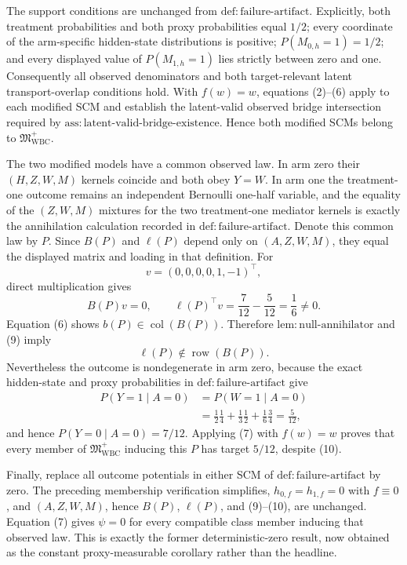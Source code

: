 The support conditions are unchanged from \(\mathrm{def{:}failure\text{-}artifact}\). Explicitly, both treatment probabilities and both proxy probabilities equal \(1/2\); every coordinate of the arm-specific hidden-state distributions is positive; \(P(M_{0,h}=1)=1/2\); and every displayed value of \(P(M_{1,h}=1)\) lies strictly between zero and one. Consequently all observed denominators and both target-relevant latent transport-overlap conditions hold. With \(f(w)=w\), equations (2)--(6) apply to each modified SCM and establish the latent-valid observed bridge intersection required by \(\mathrm{ass{:}latent\text{-}valid\text{-}bridge\text{-}existence}\). Hence both modified SCMs belong to \(\mathfrak M_{\mathrm{WBC}}^{+}\).

The two modified models have a common observed law. In arm zero their \((H,Z,W,M)\) kernels coincide and both obey \(Y=W\). In arm one the treatment-one outcome remains an independent Bernoulli one-half variable, and the equality of the \((Z,W,M)\) mixtures for the two treatment-one mediator kernels is exactly the annihilation calculation recorded in \(\mathrm{def{:}failure\text{-}artifact}\). Denote this common law by \(P\). Since \(B(P)\) and \(\ell(P)\) depend only on \((A,Z,W,M)\), they equal the displayed matrix and loading in that definition. For
\[
v=(0,0,0,0,1,-1)^{\top},
\]
direct multiplication gives
\[
B(P)v=0,
\qquad
\ell(P)^{\top}v=\frac{7}{12}-\frac{5}{12}=\frac16\ne0.
\tag{9}
\]
Equation (6) shows \(b(P)\in\operatorname{col}(B(P))\). Therefore \(\mathrm{lem{:}null\text{-}annihilator}\) and (9) imply
\[
\ell(P)\notin\operatorname{row}(B(P)).
\tag{10}
\]
Nevertheless the outcome is nondegenerate in arm zero, because the exact hidden-state and proxy probabilities in \(\mathrm{def{:}failure\text{-}artifact}\) give
\[
\begin{aligned}
P(Y=1\mid A=0)
&=P(W=1\mid A=0)\\
&=\frac12\frac14+\frac13\frac12+\frac16\frac34
=\frac5{12},
\end{aligned}
\tag{11}
\]
and hence \(P(Y=0\mid A=0)=7/12\). Applying (7) with \(f(w)=w\) proves that every member of \(\mathfrak M_{\mathrm{WBC}}^{+}\) inducing this \(P\) has target \(5/12\), despite (10).

Finally, replace all outcome potentials in either SCM of \(\mathrm{def{:}failure\text{-}artifact}\) by zero. The preceding membership verification simplifies, \(h_{0,f}=h_{1,f}=0\) with \(f\equiv0\), and \((A,Z,W,M)\), hence \(B(P)\), \(\ell(P)\), and (9)--(10), are unchanged. Equation (7) gives \(\psi=0\) for every compatible class member inducing that observed law. This is exactly the former deterministic-zero result, now obtained as the constant proxy-measurable corollary rather than the headline.